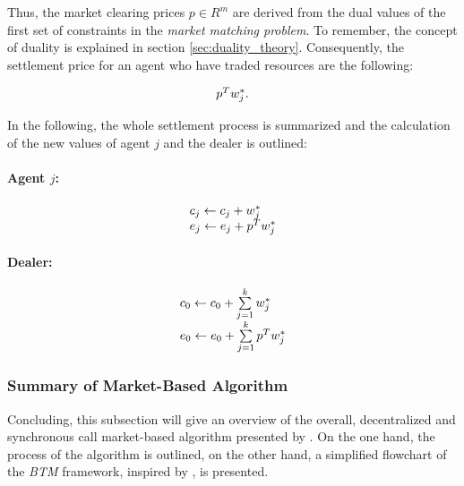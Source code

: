 Thus, the market clearing prices $p \in R^{m}$ are derived from the dual values of the first set of constraints 
in the \textit{market matching problem}. To remember, the concept of duality is explained in section \ref{sec:duality_theory}.
Consequently, the settlement price for an agent who have traded resources are the following:

\begin{equation*}
    \begin{array}{ll@{}ll}
        p^{T} w_{j}^{*}.
    \end{array}
\end{equation*}

In the following, the whole settlement process is summarized and the calculation of the new values of agent $j$ and the dealer 
is outlined:

\paragraph*{Agent $j$:}
\begin{equation*}
    \begin{array}{ll@{}ll}
        c_{j} \leftarrow c_{j} + w_{j}^{*} \\
        e_{j} \leftarrow e_{j} + p^{T} w_{j}^{*} \\
    \end{array}
\end{equation*}

\paragraph*{Dealer:}
\begin{equation*}
    \begin{array}{ll@{}ll}
        c_{0} \leftarrow c_{0} + \sum\limits_{j=1}^{k} w_{j}^{*} \\
        e_{0} \leftarrow e_{0} + \sum\limits_{j=1}^{k} p^{T} w_{j}^{*} \\
    \end{array}
\end{equation*}


\subsubsection{Summary of Market-Based Algorithm}

Concluding, this subsection will give an overview of the overall, decentralized and synchronous
call market-based algorithm presented by . On the one hand, the process of the 
algorithm is outlined, on the other hand, a simplified flowchart of the \textit{BTM} framework,
inspired by , is presented. 

